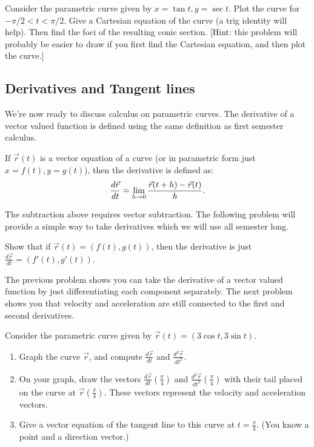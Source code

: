 \begin{problem}
Consider the parametric curve given by $x=\tan t, y=\sec t$. Plot the curve for $-\pi/2<t<\pi/2$. Give a Cartesian equation of the curve (a trig identity will help).  Then find the foci of the resulting conic section. [Hint: this problem will probably be easier to draw if you first find the Cartesian equation, and then plot the curve.]
\end{problem}

\subsection{Derivatives and Tangent lines}\label{sec:derivatives and tangent lines}
We're now ready to discuss calculus on parametric curves. The derivative of a vector valued function is defined using the same definition as first semester calculus.

\begin{definition}
If $\vec r(t)$ is a vector equation of a curve (or in parametric form just $x=f(t), y=g(t)$), then the derivative is defined as: $$\frac{d\vec r}{dt}=\displaystyle\lim_{h\to 0}\frac{\vec r(t+h)-\vec r(t)}{h}.$$
\end{definition}
The subtraction above requires vector subtraction.  The following problem will provide a simple way to take derivatives which we will use all semester long.

\begin{problem} 
%
Show that if $\vec r(t) = (f(t),g(t))$, then the derivative is just $\frac{d\vec r}{dt} = (f'(t),g'(t))$. \\ 

\noindent [The definition above says that $\frac{d\vec r}{dt}=\ds\lim_{h\to 0}\frac{\vec r(t+h)-\vec r(t)}{h}$. We were told $\vec r(t) = (f(t),g(t))$, so use this in the derivative definition.  Then try to modify the equation to obtain $\frac{d\vec r}{dt} = (f'(t),g'(t))$.]
\end{problem}
The previous problem shows you can take the derivative of a vector valued function by just differentiating each component separately. The next problem shows you that velocity and acceleration are still connected to the first and second derivatives. 

\begin{problem}  
%
Consider the parametric curve given by $\vec r(t)=( 3\cos t, 3\sin t )$. 
\begin{enumerate}
\item Graph the curve $\vec r$, and compute $\frac{d\vec r}{dt}$ and $\frac{d^2\vec r}{dt^2}$. 
\item On your graph, draw the vectors $\frac{d\vec r}{dt}\left(\frac{\pi}{4}\right)$ and $\frac{d^2\vec r}{dt^2}\left(\frac{\pi}{4}\right)$ with their tail placed on the curve at $\vec r\left(\frac{\pi}{4}\right)$. These vectors represent the velocity and acceleration vectors.
\item Give a vector equation of the tangent line to this curve at $t=\frac{\pi}{4}$. (You know a point and a direction vector.)
\end{enumerate}
\end{problem}


